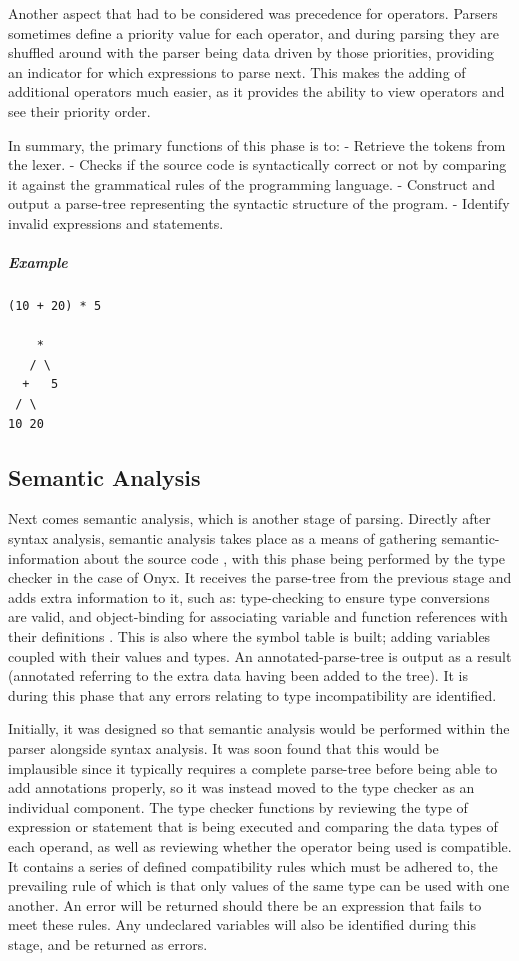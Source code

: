 \documentclass[
]{report}
\begin{document}
Another aspect that had to be considered was precedence for operators.
Parsers sometimes define a priority value for each operator, and during
\gls{parsing} they are shuffled around with the parser being data driven by
those priorities, providing an indicator for which \glspl{expression} to parse
next. This makes the adding of additional operators much easier, as it
provides the ability to view operators and see their priority order.

In summary, the primary functions of this phase is to: - Retrieve the
\glspl{token} from the lexer. - Checks if the source code is syntactically
correct or not by comparing it against the grammatical rules of the
programming language. - Construct and output a \gls{parse-tree} representing
the syntactic structure of the program. - Identify invalid \glspl{expression}
and \glspl{statement}.

\subparagraph{Example}
\begin{verbatim}
(10 + 20) * 5

    *
   / \
  +   5
 / \  
10 20
\end{verbatim}

\subsection{Semantic Analysis}
Next comes semantic analysis, which is another stage of \gls{parsing}.
Directly after syntax analysis, semantic analysis takes place as a means
of gathering \gls{semantic-information} about the source code \cite{semantics-wiki}, with
this phase being performed by the type checker in the case of Onyx. It
receives the \gls{parse-tree} from the previous stage and adds extra
information to it, such as: \gls{type-checking} to ensure type conversions are
valid, and \gls{object-binding} for associating variable and function
references with their definitions \cite{compiler-wiki}. This is also where the \gls{symbol}
table is built; adding variables coupled with their values and types. An
\gls{annotated-parse-tree} is output as a result (annotated referring to the
extra data having been added to the tree). It is during this phase that
any errors relating to type incompatibility are identified.

Initially, it was designed so that semantic analysis would be performed
within the parser alongside syntax analysis. It was soon found that this
would be implausible since it typically requires a complete \gls{parse-tree}
before being able to add annotations properly, so it was instead moved
to the type checker as an individual component. The type checker
functions by reviewing the type of \gls{expression} or \gls{statement} that is being
executed and comparing the data types of each operand, as well as
reviewing whether the operator being used is compatible. It contains a
series of defined compatibility rules which must be adhered to, the
prevailing rule of which is that only values of the same type can be
used with one another. An error will be returned should there be an
\gls{expression} that fails to meet these rules. Any undeclared variables will
also be identified during this stage, and be returned as errors.
\end{document}
